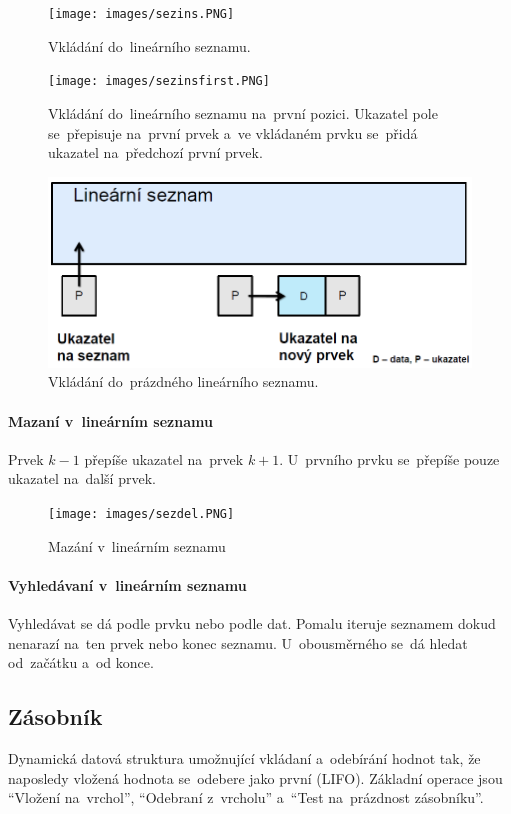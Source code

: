 \begin{figure}[ht]
	\centering
	\texttt{[image: images/sezins.PNG]}
	\caption{Vkládání do~lineárního seznamu.}
	
	\texttt{[image: images/sezinsfirst.PNG]}
	\caption{Vkládání do~lineárního seznamu na~první pozici. Ukazatel pole se~přepisuje na~první prvek a~ve vkládaném prvku se~přidá ukazatel na~předchozí první prvek.}

	\includegraphics[scale=0.5]{images/sezinsempty.PNG}
	\caption{Vkládání do~prázdného lineárního seznamu.}
\end{figure}

\paragraph{Mazaní v~lineárním seznamu} Prvek $k-1$ přepíše ukazatel na~prvek $k+1$. U~prvního prvku se~přepíše pouze ukazatel na~další prvek.

\begin{figure}[ht]
	\centering
	\texttt{[image: images/sezdel.PNG]}
	\caption{Mazání v~lineárním seznamu}
\end{figure}

\paragraph{Vyhledávaní v~lineárním seznamu} Vyhledávat se dá podle prvku nebo podle dat. Pomalu iteruje seznamem dokud nenarazí na~ten prvek nebo konec seznamu. U~obousměrného se~dá hledat od~začátku a~od konce.

\subsection{Zásobník}

Dynamická datová struktura umožnující vkládaní a~odebírání hodnot tak, že naposledy vložená hodnota se~odebere jako první (LIFO). Základní operace jsou \enquote{Vložení na~vrchol}, \enquote{Odebraní z~vrcholu} a~\enquote{Test na~prázdnost zásobníku}.

